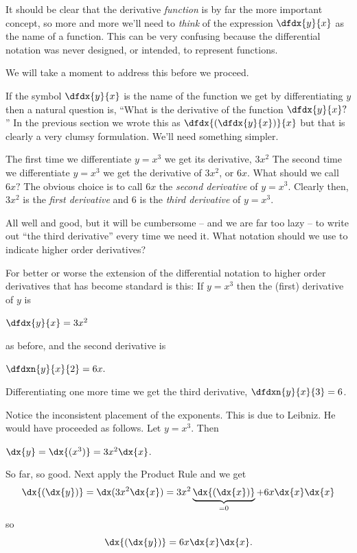 It should be clear that the derivative \emph{function} is by far the
more important concept,
so more and more we'll need to \emph{think} of the expression
$\dfdx{y}{x}$ as the name of a function. This can be very confusing
because the differential notation was never designed, or intended,
to represent functions.

We will take a moment to address this before we proceed.

If the symbol $\dfdx{y}{x}$ is the name of the function we get by
differentiating $y$ then a natural question is, ``What is the
derivative of the function $\dfdx{y}{x}?$'' In the previous section we
wrote this as $\dfdx{\left(\dfdx{y}{x}\right)}{x}$ but that is clearly
a very clumsy formulation. We'll need something simpler.

The first time we differentiate $y = x^3$ we get its derivative,
$3x^2$ The second time we differentiate $y = x^3$ we get the
derivative of $3x^2$, or $6x.$ What should we call $6x?$ The obvious
choice is to call $6x$ the \emph{second derivative} of $y=x^3.$
Clearly then, $3x^2$ is the \emph{first derivative} and $6$ is the \emph{third derivative} of
$y=x^3.$

All well and good, but it will be cumbersome -- and we are far too
lazy -- to write out ``the third
derivative'' every time we need it. What notation should we use to
indicate higher order derivatives?

For better or worse the extension of the differential notation to
higher order derivatives that has  become standard is this:
If $y = x^3$  then the (first) derivative of $y$ is \\
\centerline{  $\dfdx{y}{x}= 3x^2$}
as before, and the second derivative is\\
\centerline{ $ \dfdxn{y}{x}{2} = 6x.$}
Differentiating one more time we get the third derivative,
$  \dfdxn{y}{x}{3} = 6$.

Notice the inconsistent placement of the exponents.  This is due to
Leibniz. He would have proceeded as follows. Let $y= x^3$. Then\\
\centerline{$\dx{y}= \dx{(x^3)}= 3x^2\dx{x}$.}
So far, so good. Next apply the
Product Rule and we get
\begin{equation}
  \dx{(\dx{y})}= \dx(3x^2\dx{x}) = 3x^2\underbrace{\dx{(\dx{x})}}_{=0} +
  6x\dx{x}\dx{x}\label{eq:SecDiffProblems}
\end{equation}
so
\begin{equation}
  \dx{(\dx{y})} =    6x\dx{x}\dx{x}.    \label{eq:PRNotation} 
\end{equation}

